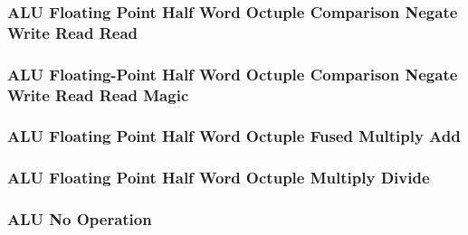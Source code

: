\subsubsection[{\small ALU Floating Point Half Word Octuple Comparison Negate Write Read Read}]{ALU Floating Point Half Word Octuple Comparison Negate Write Read Read} \label{sec:format-ALU-FHOCNWRR}



\subsubsection[{\small ALU Floating-Point Half Word Octuple Comparison Negate Write Read Read Magic}]{ALU Floating-Point Half Word Octuple Comparison Negate Write Read Read Magic} \label{sec:format-ALU-FHOCNWRR.M}



\subsubsection[{\small ALU Floating Point Half Word Octuple Fused Multiply Add}]{ALU Floating Point Half Word Octuple Fused Multiply Add} \label{sec:format-ALU-FHOFMA}



\subsubsection[{\small ALU Floating Point Half Word Octuple Multiply Divide}]{ALU Floating Point Half Word Octuple Multiply Divide} \label{sec:format-ALU-FHOMUL}



\subsubsection[{\small ALU No Operation}]{ALU No Operation} \label{sec:format-ALU-NOP}



